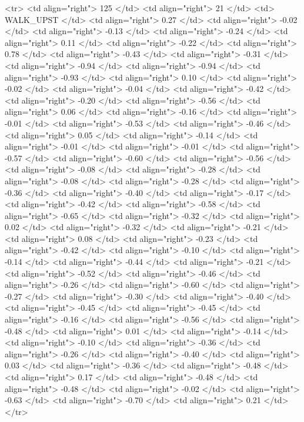   <tr> <td align="right"> 125 </td> <td align="right">  21 </td> <td> WALK_UPST </td> <td align="right"> 0.27 </td> <td align="right"> -0.02 </td> <td align="right"> -0.13 </td> <td align="right"> -0.24 </td> <td align="right"> 0.11 </td> <td align="right"> -0.22 </td> <td align="right"> 0.78 </td> <td align="right"> -0.43 </td> <td align="right"> -0.31 </td> <td align="right"> -0.94 </td> <td align="right"> -0.94 </td> <td align="right"> -0.93 </td> <td align="right"> 0.10 </td> <td align="right"> -0.02 </td> <td align="right"> -0.04 </td> <td align="right"> -0.42 </td> <td align="right"> -0.20 </td> <td align="right"> -0.56 </td> <td align="right"> 0.06 </td> <td align="right"> -0.16 </td> <td align="right"> -0.01 </td> <td align="right"> -0.53 </td> <td align="right"> -0.46 </td> <td align="right"> 0.05 </td> <td align="right"> -0.14 </td> <td align="right"> -0.01 </td> <td align="right"> -0.01 </td> <td align="right"> -0.57 </td> <td align="right"> -0.60 </td> <td align="right"> -0.56 </td> <td align="right"> -0.08 </td> <td align="right"> -0.28 </td> <td align="right"> -0.08 </td> <td align="right"> -0.28 </td> <td align="right"> -0.36 </td> <td align="right"> -0.40 </td> <td align="right"> -0.17 </td> <td align="right"> -0.42 </td> <td align="right"> -0.58 </td> <td align="right"> -0.65 </td> <td align="right"> -0.32 </td> <td align="right"> 0.02 </td> <td align="right"> -0.32 </td> <td align="right"> -0.21 </td> <td align="right"> 0.08 </td> <td align="right"> -0.23 </td> <td align="right"> -0.42 </td> <td align="right"> -0.10 </td> <td align="right"> -0.14 </td> <td align="right"> -0.44 </td> <td align="right"> -0.21 </td> <td align="right"> -0.52 </td> <td align="right"> -0.46 </td> <td align="right"> -0.26 </td> <td align="right"> -0.60 </td> <td align="right"> -0.27 </td> <td align="right"> -0.30 </td> <td align="right"> -0.40 </td> <td align="right"> -0.45 </td> <td align="right"> -0.45 </td> <td align="right"> -0.16 </td> <td align="right"> -0.56 </td> <td align="right"> -0.48 </td> <td align="right"> 0.01 </td> <td align="right"> -0.14 </td> <td align="right"> -0.10 </td> <td align="right"> -0.36 </td> <td align="right"> -0.26 </td> <td align="right"> -0.40 </td> <td align="right"> 0.03 </td> <td align="right"> -0.36 </td> <td align="right"> -0.48 </td> <td align="right"> 0.17 </td> <td align="right"> -0.48 </td> <td align="right"> -0.48 </td> <td align="right"> -0.02 </td> <td align="right"> -0.63 </td> <td align="right"> -0.70 </td> <td align="right"> 0.21 </td> </tr>
